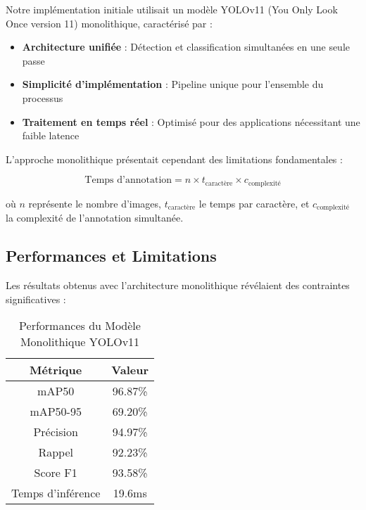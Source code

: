 \documentclass[letterpaper, 10 pt, conference]{ieeeconf}  %
\begin{document}
Notre implémentation initiale utilisait un modèle YOLOv11 (You Only Look Once version 11) monolithique, caractérisé par :

\begin{itemize}
\item \textbf{Architecture unifiée} : Détection et classification simultanées en une seule passe
\item \textbf{Simplicité d'implémentation} : Pipeline unique pour l'ensemble du processus
\item \textbf{Traitement en temps réel} : Optimisé pour des applications nécessitant une faible latence
\end{itemize}

L'approche monolithique présentait cependant des limitations fondamentales :

\begin{equation}
\text{Temps d'annotation} = n \times t_{\text{caractère}} \times c_{\text{complexité}}
\end{equation}

où $n$ représente le nombre d'images, $t_{\text{caractère}}$ le temps par caractère, et $c_{\text{complexité}}$ la complexité de l'annotation simultanée.

\subsection{Performances et Limitations}

Les résultats obtenus avec l'architecture monolithique révélaient des contraintes significatives :

\begin{table}[h]
\caption{Performances du Modèle Monolithique YOLOv11}
\label{table_monolithique}
\begin{center}
\begin{tabular}{|c|c|}
\hline
\textbf{Métrique} & \textbf{Valeur} \\
\hline
mAP50 & 96.87\% \\
\hline
mAP50-95 & 69.20\% \\
\hline
Précision & 94.97\% \\
\hline
Rappel & 92.23\% \\
\hline
Score F1 & 93.58\% \\
\hline
Temps d'inférence & 19.6ms \\
\hline
\end{tabular}
\end{center}
\end{table}
\end{document}
